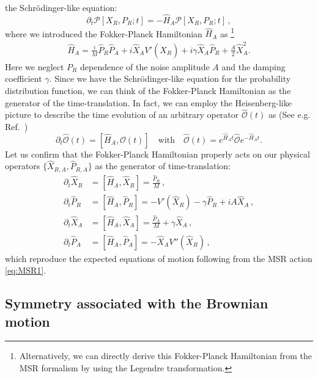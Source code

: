 \documentclass[a4paper,11pt]{article}
\newcommand{\Pcal}{{\mathcal{P}}}
\newcommand{\hOcal}{{\hat{\mathcal{O}}}}
\newcommand{\with}{{\quad\mathrm{with}}\quad}
\begin{document}
the Schr\"odinger-like equation:
\begin{equation}
 \partial_t \Pcal [X_R,P_R;t] = - \hat{H}_A \Pcal [X_R,P_R;t]\,,\label{eq:sch}
\end{equation}
where we introduced the Fokker-Planck Hamiltonian $\hat{H}_A$ as%
\footnote{
Alternatively, we can directly derive this Fokker-Planck Hamiltonian 
from the MSR formalism by using the Legendre transformation.
} 
\begin{equation}
 \begin{split}
  \hat{H}_A 
  = \frac{i}{M} \hat{P}_R \hat{P}_A  
  + i \hat{X}_A V'(\hat{X}_R) 
  + i\gamma \hat{X}_A \hat{P}_R
  + \frac{A}{2} \hat{X}_A^2.
 \end{split}
 \label{eq:FP2}
\end{equation}
Here we neglect $P_R$ dependence of the noise amplitude $A$ 
and the damping coefficient $\gamma$.
Since we have the Schr\"odinger-like equation for 
the probability distribution function, 
we can think of the Fokker-Planck Hamiltonian as the generator of the 
time-translation.
In fact, we can employ the Heisenberg-like picture to describe 
the time evolution of an arbitrary operator $\hOcal (t)$ as 
(See e.g. Ref.~\cite{Zinn1996quantum}) 
\begin{equation}
 \partial_t \hOcal (t) = [\hat{H}_A, \hOcal (t)]
  \with
  \hOcal (t) = e^{ \hat{H}_A t } \hOcal e^{- \hat{H}_A t}.
  \label{eq:EoMinFP}
\end{equation}
Let us confirm that the Fokker-Planck Hamiltonian properly acts on 
our physical operators $\{\hat{X}_{R,A}, \hat{P}_{R,A}\}$ 
as the generator of time-translation:
\begin{align}
 \partial_t \hat{X}_R &= [\hat{H}_A, \hat{X}_R] = \frac{\hat{P}_R}{M} 
 \,\label{HPtrsf:1},
 \\
 \partial_t \hat{P}_R &= [\hat{H}_A, \hat{P}_R] 
 = -V'(\hat{X}_R) - \gamma \hat{P}_R + iA \hat{X}_A \,, 
 \\ 
 \partial_t \hat{X}_A &= [\hat{H}_A, \hat{X}_A] 
 = \frac{\hat{P}_A}{M} + \gamma \hat{X}_A\,,
 \\
 \partial_t \hat{P}_A &= [\hat{H}_A, \hat{P}_A] 
 = - \hat{X}_A  V''(\hat{X}_R) \,\label{HPtrsf:4},
\end{align}
which reproduce the expected equations of motion following from 
the MSR action \eqref{eq:MSR1}. 


\subsection{Symmetry associated with the Brownian motion}
\label{section:BrownianSymmetries}
\end{document}
